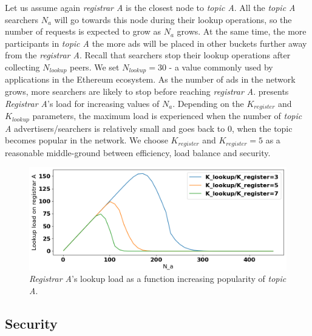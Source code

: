 Let us assume again \emph{registrar A} is the closest node to \emph{topic A}. All the \emph{topic A} searchers $N_a$ will go towards this node during their lookup operations, so the number of requests is expected to grow as $N_a$ grows. At the same time, the more participants in \emph{topic A} the more ads will be placed in other buckets further away from the \emph{registrar A}. Recall that searchers stop their lookup operations after collecting $N_{lookup}$ peers.  We set $N_{lookup} = 30$ - a value commonly used by applications in the Ethereum ecosystem. As the number of ads in the network grows, more searchers are likely to stop before reaching \emph{registrar A}.  presents \emph{Registrar A}'s load for increasing values of $N_a$. Depending on the $K_{register}$ and $K_{lookup}$ parameters, the maximum load is experienced when the number of \emph{topic A} advertisers/searchers is relatively small and goes back to $0$, when the topic becomes popular in the network. We choose $K_{register}$ and $K_{register} =5$ as a reasonable middle-ground between efficiency, load balance and security.

\begin{figure}[t]
    \includegraphics[width=1\linewidth]{img/fairness_lookup}
    \vspace{-0.05in}
    \caption{\emph{Registrar A}'s lookup load as a function increasing popularity of \emph{topic A}.
    }
    \label{fig:fairness_lookup}
    \vspace{-0.15in}
\end{figure}

\subsection{Security}

